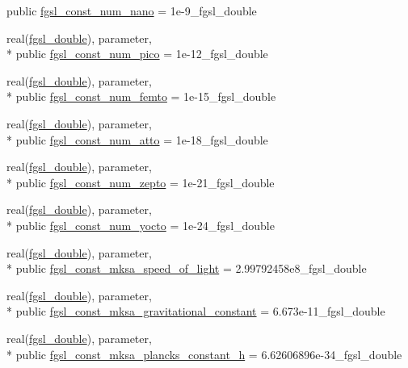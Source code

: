 \begin{DoxyCompactItemize}
public \hyperlink{classfgsl_a18d57365a461c2adc8f4e0ddb4c690d6}{fgsl\-\_\-const\-\_\-num\-\_\-nano} = 1e-\/9\-\_\-fgsl\-\_\-double
\item 
real(\hyperlink{classfgsl_a9af5113378e0f000eb479d3f90196ddf}{fgsl\-\_\-double}), parameter, \\*
public \hyperlink{classfgsl_a8a137e17b45fbfd8a37ef012e9b522ab}{fgsl\-\_\-const\-\_\-num\-\_\-pico} = 1e-\/12\-\_\-fgsl\-\_\-double
\item 
real(\hyperlink{classfgsl_a9af5113378e0f000eb479d3f90196ddf}{fgsl\-\_\-double}), parameter, \\*
public \hyperlink{classfgsl_a3ab8d745c9129ec33f7556e68234b60b}{fgsl\-\_\-const\-\_\-num\-\_\-femto} = 1e-\/15\-\_\-fgsl\-\_\-double
\item 
real(\hyperlink{classfgsl_a9af5113378e0f000eb479d3f90196ddf}{fgsl\-\_\-double}), parameter, \\*
public \hyperlink{classfgsl_aca23ff810481681a4329c406eb3c4bbc}{fgsl\-\_\-const\-\_\-num\-\_\-atto} = 1e-\/18\-\_\-fgsl\-\_\-double
\item 
real(\hyperlink{classfgsl_a9af5113378e0f000eb479d3f90196ddf}{fgsl\-\_\-double}), parameter, \\*
public \hyperlink{classfgsl_ac924f9358aa8ca1b7a72025328901e8e}{fgsl\-\_\-const\-\_\-num\-\_\-zepto} = 1e-\/21\-\_\-fgsl\-\_\-double
\item 
real(\hyperlink{classfgsl_a9af5113378e0f000eb479d3f90196ddf}{fgsl\-\_\-double}), parameter, \\*
public \hyperlink{classfgsl_a97bcc951d0797621c0a06cb1d63cad49}{fgsl\-\_\-const\-\_\-num\-\_\-yocto} = 1e-\/24\-\_\-fgsl\-\_\-double
\item 
real(\hyperlink{classfgsl_a9af5113378e0f000eb479d3f90196ddf}{fgsl\-\_\-double}), parameter, \\*
public \hyperlink{classfgsl_a3d8ceae8504f8bd508cbd8865e1ba1b8}{fgsl\-\_\-const\-\_\-mksa\-\_\-speed\-\_\-of\-\_\-light} = 2.\-99792458e8\-\_\-fgsl\-\_\-double
\item 
real(\hyperlink{classfgsl_a9af5113378e0f000eb479d3f90196ddf}{fgsl\-\_\-double}), parameter, \\*
public \hyperlink{classfgsl_a74c4f68c51be744dc16f9de6679690a1}{fgsl\-\_\-const\-\_\-mksa\-\_\-gravitational\-\_\-constant} = 6.\-673e-\/11\-\_\-fgsl\-\_\-double
\item 
real(\hyperlink{classfgsl_a9af5113378e0f000eb479d3f90196ddf}{fgsl\-\_\-double}), parameter, \\*
public \hyperlink{classfgsl_a1f1f5a27cac13f7f29c34ccb809e2eae}{fgsl\-\_\-const\-\_\-mksa\-\_\-plancks\-\_\-constant\-\_\-h} = 6.\-62606896e-\/34\-\_\-fgsl\-\_\-double

\end{DoxyCompactItemize}
